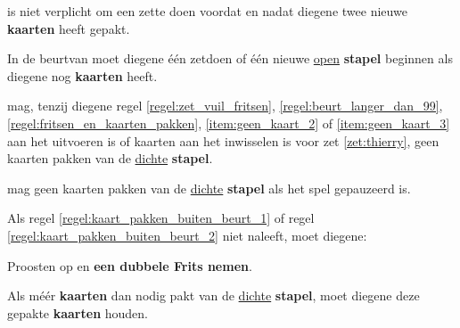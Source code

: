\vervolgLijst{}
\item \EenSpeler is niet verplicht om een zet\footnotemark[3] te doen voordat en nadat diegene twee nieuwe \textbf{kaarten} heeft gepakt.
\eindLijst{}

\vervolgLijst{}
\item In de beurt\footnotemark[1] van \eenSpeler moet diegene \'e\'en zet\footnotemark[3] doen of \'e\'en nieuwe \ul{open} \textbf{stapel} beginnen als diegene nog \textbf{kaarten} heeft.
\eindLijst{}

\footnotetext[2]{\footnoteFritsjeDesNemen}

\newpage
{}


\vervolgLijst{}
\item \EenSpeler mag, tenzij diegene regel \ref{regel:zet_vuil_fritsen}, \ref{regel:beurt_langer_dan_99}, \ref{regel:fritsen_en_kaarten_pakken}, \ref{item:geen_kaart_2} of \ref{item:geen_kaart_3} aan het uitvoeren is of kaarten aan het inwisselen is voor zet \ref{zet:thierry}, geen kaarten pakken van de \ul{dichte} \textbf{stapel}.
\label{regel:kaart_pakken_buiten_beurt_1}
\eindLijst{}

\vervolgLijst{}
\item \EenSpeler mag geen kaarten pakken van de \ul{dichte} \textbf{stapel} als het spel gepauzeerd is.
\label{regel:kaart_pakken_buiten_beurt_2}
\eindLijst{}

\vervolgLijst{}
\item Als \eenSpeler regel \ref{regel:kaart_pakken_buiten_beurt_1} of regel \ref{regel:kaart_pakken_buiten_beurt_2} niet naleeft, moet diegene:
\puntLijst{}
\item Proosten op  en \textbf{een dubbele Frits nemen}\footnotemark[1].
\eindPuntLijst{}
\label{regel:kaart_pakken_buiten_beurt_straf}
\eindLijst{}

\vervolgLijst{}
\item Als \eenSpeler méér \textbf{kaarten} dan nodig pakt van de \ul{dichte} \textbf{stapel}, moet diegene deze gepakte \textbf{kaarten} houden.
\eindLijst{}

